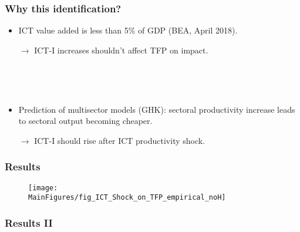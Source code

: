 \documentclass{beamer}
\def \MainFigures{../Draft_Summer2018/MainFigures}
\def\myFigWidth{2.0in}
\begin{document}
\begin{frame}
	\frametitle{Why this identification?}
	
	\begin{itemize}
	\item ICT value added is less than 5\% of GDP (BEA, April 2018). 
	
	$\rightarrow$ ICT-I increases shouldn't affect TFP on impact.
	
	\
	
	\
	
	\item Prediction of multisector models (GHK): sectoral productivity increase leads to sectoral output becoming cheaper. 
	
	$\rightarrow$ ICT-I should rise after ICT productivity shock.
	\end{itemize}

\end{frame}


\begin{frame}
	\frametitle{Results}
	
\begin{figure}[h!]
\begin{center}
\texttt{[image: \\MainFigures/fig\_ICT\_Shock\_on\_TFP\_empirical\_noH]}
\label{fig:TFP_main}
\end{center}
\end{figure}
	

\end{frame}


\begin{frame}
	\frametitle{Results II}
	\label{results2}

\begin{figure}[h!]
{} \hspace{.2in%
} 
 \hspace{.2in%
} 
 \hspace{.2in%
} 
\end{figure}	


\hyperlink{largeVAR}{}	
\end{frame}
\end{document}
